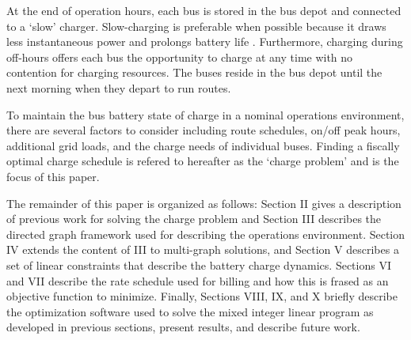 \par At the end of operation hours, each bus is stored in the bus depot and connected to a `slow' charger.  Slow-charging is preferable when possible because it draws less instantaneous power and prolongs battery life \cite{houbbadi_optimal_2019}.  Furthermore, charging during off-hours offers each bus the opportunity to charge at any time with no contention for charging resources. The buses reside in the bus depot until the next morning when they depart to run routes.
\par To maintain the bus battery state of charge in a nominal operations environment, there are several factors to consider including route schedules, on/off peak hours, additional grid loads, and the charge needs of individual buses. Finding a fiscally optimal charge schedule is refered to hereafter as the `charge problem' and is the focus of this paper.
\par The remainder of this paper is organized as follows: Section II gives a description of previous work for solving the charge problem and Section III describes the directed graph framework used for describing the operations environment.  Section IV extends the content of III to multi-graph solutions, and Section V describes a set of linear constraints that describe the battery charge dynamics.  Sections VI and VII describe the rate schedule used for billing and how this is frased as an objective function to minimize. Finally, Sections VIII, IX, and X briefly describe the optimization software used to solve the mixed integer linear program as developed in previous sections, present results, and describe future work.
